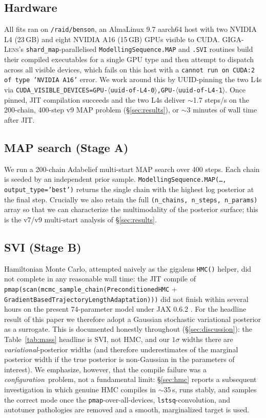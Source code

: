 \documentclass[11pt,letterpaper]{article}
\newcommand{\gigalens}{\textsc{GIGA-Lens}}
\begin{document}
\subsection{Hardware}
All fits ran on \texttt{/raid/benson}, an AlmaLinux 9.7 aarch64 host
with two NVIDIA L4 (23\,GB) and eight NVIDIA A16 (15\,GB) GPUs visible
to CUDA. \gigalens's \texttt{shard\_map}-parallelised
\texttt{ModellingSequence.MAP} and \texttt{.SVI} routines build their
compiled executables for a single GPU type and then attempt to dispatch
across all visible devices, which fails on this host with a
\texttt{cannot run on CUDA:2 of type 'NVIDIA A16'} error. We work
around this by UUID-pinning the two L4s via
\texttt{CUDA\_VISIBLE\_DEVICES=GPU-$\langle$uuid-of-L4-0$\rangle$,GPU-$\langle$uuid-of-L4-1$\rangle$}.
Once pinned, JIT compilation succeeds and the two L4s deliver
$\sim$1.7 steps/s on the 200-chain, 400-step v9 MAP problem
(\S\ref{sec:results}), or $\sim$3 minutes of wall time after JIT.

\subsection{MAP search (Stage A)}
We run a 200-chain Adabelief \citep[][lr$=10^{-2}$, $b_{1}=0.95$,
$b_{2}=0.99$]{birrer2018lenstronomy} multi-start MAP search over
400 steps. Each chain is seeded by an independent prior sample.
\texttt{ModellingSequence.MAP(\dots,\,output\_type='best')} returns the
single chain with the highest log posterior at the final step. Crucially
we also retain the full
\texttt{(n\_chains,\,n\_steps,\,n\_params)} array so that we can
characterize the multimodality of the posterior surface; this is the
v7/v9 multi-start analysis of \S\ref{sec:results}.

\subsection{SVI (Stage B)}
Hamiltonian Monte Carlo, attempted naively as the gigalens
\texttt{HMC()} helper, did not complete in any reasonable wall time:
the JIT compile of
\texttt{pmap(scan(mcmc\_sample\_chain(PreconditionedHMC} $+$
\texttt{GradientBasedTrajectoryLengthAdaptation)))} did not finish
within several hours on the present 74-parameter model under
JAX 0.6.2 \citep{bradbury2018jax}. For the headline result of this
paper we therefore adopt a Gaussian stochastic variational posterior as
a surrogate. This is documented honestly throughout
(\S\ref{sec:discussion}): the Table~\ref{tab:mass} headline is SVI, not
HMC, and our $1\sigma$ widths there are {\it variational}-posterior
widths (and therefore underestimates of the marginal posterior width if
the true posterior is non-Gaussian in the parameters of interest). We
emphasize, however, that the compile failure was a {\it configuration}\
problem, not a fundamental limit: \S\ref{sec:hmc} reports a subsequent
investigation in which genuine HMC compiles in $\sim$35\,s, runs stably,
and samples the correct mode once the \texttt{pmap}-over-all-devices,
\texttt{lstsq}-convolution, and autotuner pathologies are removed and a
smooth, marginalized target is used.
\end{document}
